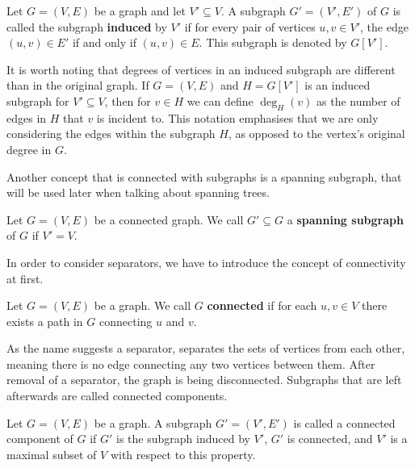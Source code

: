 \begin{defn}
Let $G = (V, E)$ be a graph and let $V' \subseteq V$. A subgraph $G' = (V', E')$ 
of $G$ is called the subgraph \textbf{induced} by $V'$ if for every pair of vertices 
$u, v \in V'$, the edge $(u, v) \in E'$ if and only if $(u, v) \in E$. 
This subgraph is denoted by $G[V']$.
\end{defn}

It is worth noting that degrees of vertices in an induced subgraph are different than in 
the original graph. If $G = (V, E)$ and $H = G[V']$ is an induced subgraph for $V' \subseteq V$, then
for $v \in H$ we can define $\deg_H(v)$ as the number of edges in $H$ that $v$ is incident to. This notation
emphasises that we are only considering the edges within the subgraph $H$, as opposed to the vertex's 
original degree in $G$.

Another concept that is connected with subgraphs is a spanning subgraph, that will be used
later when talking about spanning trees.

\begin{defn}
\label{defn:spanning-tree}
Let $G = (V, E)$ be a connected graph. We call $G' \subseteq G$ a \textbf{spanning subgraph} 
    of $G$ if $V' = V$.
\end{defn}

In order to consider separators, we have to introduce the concept of connectivity 
at first.

\begin{defn}
\label{defn:connectivity}
Let $G = (V, E)$ be a graph. We call $G$ \textbf{connected} if for each $u, v \in V$ there exists a path
    in $G$ connecting $u$ and $v$.
\end{defn}

As the name suggests a separator, separates the sets of vertices from each other, meaning 
there is no edge connecting any two vertices between them. After removal of a separator, 
the graph is being disconnected.
Subgraphs that are left afterwards are called connected components.

\begin{defn}
\label{defn:connected-component}
    Let $G = (V, E)$ be a graph. A subgraph $G' = (V', E')$ is called a connected 
    component of $G$ if $G'$ is the subgraph induced by $V'$, 
    $G'$ is connected, and $V'$ is a maximal subset of $V$ with respect to this property.
\end{defn}

